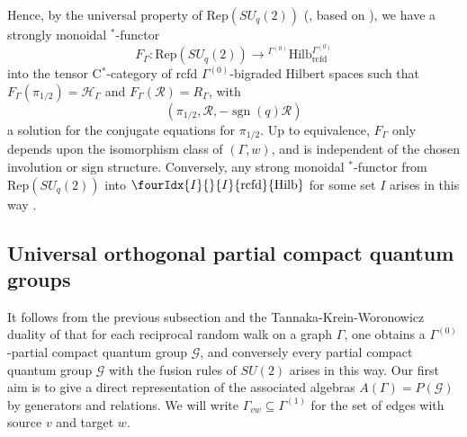 \documentclass[10pt]{article}
\DeclareMathOperator{\rcf}{\mathrm{rcfd}}
\DeclareMathOperator{\sgn}{\mathrm{sgn}}
\newcommand{\Hsp}{\mathcal{H}}
\newcommand{\Hilb}{\mathrm{Hilb}}
\newcommand{\Rep}{\mathrm{Rep}}
\newcommand{\Gr}[5]{\fourIdx{#2}{#4}{#3}{#5}{#1}}%
\theoremstyle{definition}
\numberwithin{equation}{section}
\begin{document}
Hence, by the universal property of $\Rep(SU_q(2))$ (\cite[Theorem 1.4]{DCY1}, based on \cite{Tur1,EtO1,Yam1,Pin2,Pin3}), we have a strongly monoidal $^*$-functor
\begin{equation}\label{EqForget} F_{\Gamma}: \Rep(SU_q(2)) \rightarrow {}^{\Gamma^{(0)}}\Hilb_{\rcf}^{\Gamma^{(0)}}\end{equation} into the tensor C$^*$-category of rcfd $\Gamma^{(0)}$-bigraded Hilbert spaces such that $F_{\Gamma}(\pi_{1/2}) = \Hsp_{\Gamma}$ and $F_{\Gamma}(\mathscr{R}) = R_{\Gamma}$, with \[(\pi_{1/2},\mathscr{R},-\sgn(q)\mathscr{R})\] a solution for the conjugate equations for $\pi_{1/2}$. Up to equivalence, $F_{\Gamma}$ only depends upon the isomorphism class of $(\Gamma,w)$, and is independent of the chosen involution or sign structure. Conversely, any strong monoidal $^*$-functor from $\Rep(SU_q(2))$ into $\Gr{\Hilb}{I}{I}{}{\rcf}$ for some set $I$ arises in this way \cite{DCY2}.

\subsection{Universal orthogonal partial compact quantum groups}


It follows from the previous subsection and the Tannaka-Krein-Woronowicz duality of \cite[Theorem 4.14]{DCT1} that for each reciprocal random walk on a graph $\Gamma$, one obtains a $\Gamma^{(0)}$-partial compact quantum group $\mathscr{G}$, and conversely every partial compact quantum group $\mathscr{G}$ with the fusion rules of $SU(2)$ arises in this way. Our first aim is to give a direct representation of the associated algebras $A(\Gamma) = P(\mathscr{G})$ by generators and relations. We will write $\Gamma_{vw}\subseteq \Gamma^{(1)}$ for the set of edges with source $v$ and target $w$.
\end{document}
